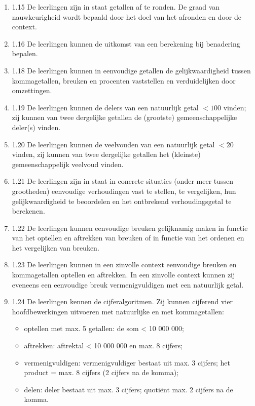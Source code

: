 \documentclass{article}
\begin{document}
\begin{enumerate}
    \item 1.15   De leerlingen zijn in staat getallen af te ronden. De graad van nauwkeurigheid wordt bepaald door het doel van het afronden en door de context.
    
    \item 1.16   De leerlingen kunnen de uitkomst van een berekening bij benadering bepalen.
    
    \item 1.18   De leerlingen kunnen in eenvoudige getallen de gelijkwaardigheid tussen kommagetallen, breuken en procenten vaststellen en verduidelijken door omzettingen.
    
    \item 1.19   De leerlingen kunnen de delers van een natuurlijk getal \(< 100\) vinden; zij kunnen van twee dergelijke getallen de (grootste) gemeenschappelijke deler(s) vinden.
    
    \item 1.20   De leerlingen kunnen de veelvouden van een natuurlijk getal \( < 20 \) vinden, zij kunnen van twee dergelijke getallen het (kleinste) gemeenschappelijk veelvoud vinden.
    
    \item 1.21   De leerlingen zijn in staat in concrete situaties (onder meer tussen grootheden) eenvoudige verhoudingen vast te stellen, te vergelijken, hun gelijkwaardigheid te beoordelen en het ontbrekend verhoudingsgetal te berekenen.
    
    \item 1.22   De leerlingen kunnen eenvoudige breuken gelijknamig maken in functie van het optellen en aftrekken van breuken of in functie van het ordenen en het vergelijken van breuken.
    
    \item 1.23   De leerlingen kunnen in een zinvolle context eenvoudige breuken en kommagetallen optellen en aftrekken. In een zinvolle context kunnen zij eveneens een eenvoudige breuk vermenigvuldigen met een natuurlijk getal.
    
    \item 1.24   De leerlingen kennen de cijferalgoritmen. Zij kunnen cijferend vier hoofdbewerkingen uitvoeren met natuurlijke en met kommagetallen:
    \begin{itemize}
        \item optellen met max. 5 getallen: de som < 10 000 000;
        \item aftrekken: aftrektal < 10 000 000 en max. 8 cijfers;
        \item vermenigvuldigen: vermenigvuldiger bestaat uit max. 3 cijfers; het product = max. 8 cijfers (2 cijfers na de komma);
        \item delen: deler bestaat uit max. 3 cijfers; quotiënt max. 2 cijfers na de komma.
    \end{itemize}
    

\end{enumerate}
\end{document}
